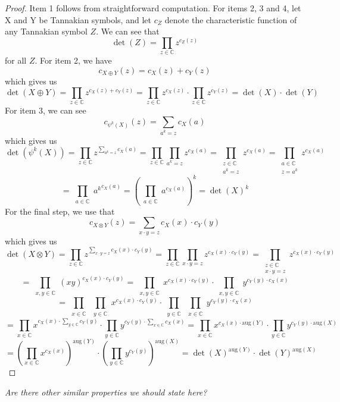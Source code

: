 \documentclass[a4paper]{article}
\theoremstyle{definition}
\newtheorem{proposition}[theorem]{Proposition}
\theoremstyle{remark}
\newcommand{\aug}{\mathrm{aug}}
\newcommand{\C}{\mathbb{C}}
\begin{document}
\begin{proof}
Item 1 follows from straightforward computation. For items 2, 3 and 4, let X and Y be Tannakian symbols, and let $c_Z$ denote the characteristic function of any Tannakian symbol $Z$. We can see that 
$$\det(Z) = \prod_{z \in \C} z^{c_Z(z)}$$
for all $Z$. For item 2, we have 
$$c_{X \oplus Y}(z) = c_X(z) + c_Y(z)$$
which gives us
$$\det(X \oplus Y) = \prod_{z \in \C} z^{c_X(z) + c_Y(z)} = \prod_{z \in \C} z^{c_X(z)} \cdot \prod_{z \in \C} z^{c_Y(z)} = \det(X) \cdot \det(Y)$$
For item 3, we can see
$$c_{\psi^k(X)}(z) = \sum_{a^k = z} c_{X}(a)$$
which gives us
$$\det(\psi^k(X)) = \prod_{z \in \C} z^{\sum\limits_{a^k = z} c_{X}(a)} = \prod_{z \in \C} \prod_{a^k = z} z^{c_{X}(a)} = \prod_{\substack{z \in \C \\ a^k = z}} z^{c_{X}(a)} = \prod_{\substack{a \in \C \\ z = a^k}} z^{c_{X}(a)}$$
$$= \prod_{\substack{a \in \C}} {a^k}^{c_{X}(a)} = \left(\prod_{\substack{a \in \C}} a^{c_{X}(a)}\right)^k = \det(X)^k$$
For the final step, we use that 
$$c_{X \otimes Y}(z) = \sum_{x \cdot y=z} c_X(x) \cdot c_Y(y)$$
which gives us
$$\det(X \otimes Y) = \prod_{z \in \C} z^{\sum\limits_{x \cdot y=z} c_X(x) \cdot c_Y(y)} = \prod_{z \in \C} \prod_{x \cdot y=z} z^{ c_X(x) \cdot c_Y(y)} = \prod_{\substack{z \in \C \\ x \cdot y=z}}  z^{ c_X(x) \cdot c_Y(y)}$$
$$ = \prod_{\substack{x, y \in \C}} (xy)^{ c_X(x) \cdot c_Y(y)} = \prod_{\substack{x, y \in \C}} x^{ c_X(x) \cdot c_Y(y)} \cdot \prod_{\substack{x, y \in \C}} y^{ c_Y(y) \cdot c_X(x) }$$
$$= \prod_{\substack{x \in \C}} \prod_{\substack{y \in \C}}x^{ c_X(x) \cdot c_Y(y)} \cdot \prod_{\substack{y \in \C}} \prod_{\substack{x \in \C}} y^{ c_Y(y) \cdot c_X(x)}$$
$$= \prod_{x \in \C} x^{ c_X(x) \cdot \sum\limits_{y \in \C} c_Y(y)} \cdot \prod_{y \in \C} y^{ c_Y(y) \cdot \sum\limits_{x \in \C} c_X(x)}= \prod_{x \in \C} x^{ c_X(x) \cdot \aug(Y)} \cdot \prod_{y \in \C} y^{ c_Y(y) \cdot \aug(X)}$$
$$= \left(\prod_{x \in \C} x^{ c_X(x)} \right)^{\aug(Y)} \cdot \left(\prod_{y \in \C} y^{ c_Y(y)} \right)^{\aug(X)} = \det(X)^{\aug(Y)} \cdot \det(Y)^{\aug(X)}$$

\end{proof}

\emph{Are there other similar properties we should state here?} %
\end{document}
